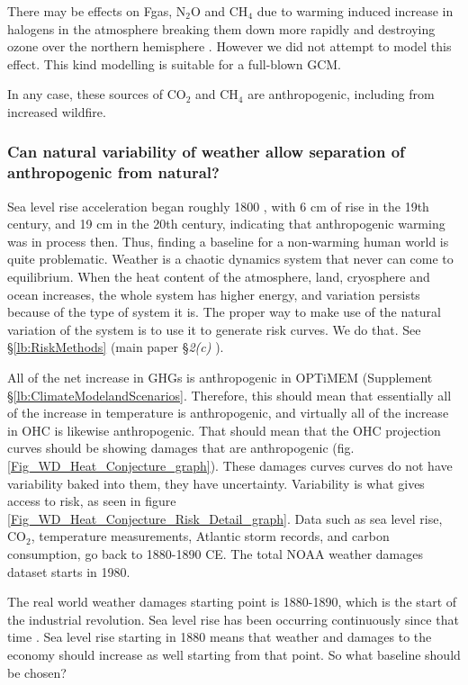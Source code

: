 \documentclass{article}
\begin{document}
There may be effects on Fgas, N$_2$O and CH$_4$ due to warming induced increase in halogens in the atmosphere breaking them down more rapidly and destroying ozone over the northern hemisphere \cite{Anderson2017ChlorineBromineCatalysis,Anderson2018CouplingCatalysis}. However we did not attempt to model this effect. This kind modelling is suitable for a full-blown GCM. 

In any case, these sources of CO$_2$ and CH$_4$ are anthropogenic, including from increased wildfire. 

\subsubsection{Can natural variability of weather allow separation of anthropogenic from natural?}

Sea level rise acceleration began roughly 1800 \cite{Jevrejeva2008RecentGlobalSeaLevelAccelerationStartedOver200YearsAgo}, with 6 cm of rise in the 19th century, and 19 cm in the 20th century, indicating that anthropogenic warming was in process then. Thus, finding a baseline for a non-warming human world is quite problematic.  Weather is a chaotic dynamics system that never can come to equilibrium. When the heat content of the atmosphere, land, cryosphere and ocean increases, the whole system has higher energy, and variation persists because of the type of system it is. The proper way to make use of the natural variation of the system is to use it to generate risk curves. We do that. See \S\ref{lb:RiskMethods}  (main paper \S\emph{2(c)} ). 

All of the net increase in GHGs is anthropogenic in OPTiMEM (Supplement \S\ref{lb:ClimateModelandScenarios}. Therefore, this should mean that essentially all of the increase in temperature is anthropogenic, and virtually all of the increase in OHC is likewise anthropogenic. That should mean that the OHC projection curves should be showing damages that are anthropogenic (fig. \ref{Fig_WD_Heat_Conjecture_graph}). These damages curves curves do not have variability baked into them, they have uncertainty. Variability is what gives access to risk, as seen in figure \ref{Fig_WD_Heat_Conjecture_Risk_Detail_graph}. Data such as sea level rise, CO$_2$, temperature measurements, Atlantic storm records, and carbon consumption, go back to 1880-1890 CE. The total NOAA weather damages dataset starts in 1980. 

The real world weather damages starting point is 1880-1890, which is the start of the industrial revolution. Sea level  rise has been occurring continuously since that time \cite{Church2011SeaLevelRiseLate19th_Early21stCentury, NASA_GSFC2021GlobalMeanSeaLevelTrend}. Sea level rise starting in 1880 means that weather and damages to the economy should increase as well starting from that point. So what baseline should be chosen? 
\end{document}
